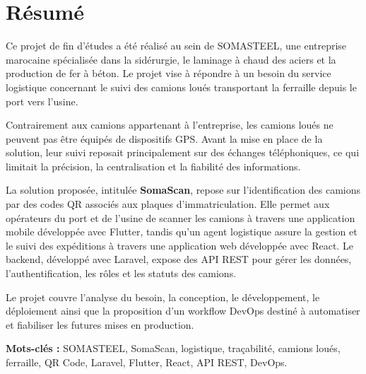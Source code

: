 \chapter*{Résumé}
{}

Ce projet de fin d'études a été réalisé au sein de SOMASTEEL, une entreprise marocaine spécialisée dans la sidérurgie, le laminage à chaud des aciers et la production de fer à béton. Le projet vise à répondre à un besoin du service logistique concernant le suivi des camions loués transportant la ferraille depuis le port vers l'usine.

Contrairement aux camions appartenant à l'entreprise, les camions loués ne peuvent pas être équipés de dispositifs GPS. Avant la mise en place de la solution, leur suivi reposait principalement sur des échanges téléphoniques, ce qui limitait la précision, la centralisation et la fiabilité des informations.

La solution proposée, intitulée \textbf{SomaScan}, repose sur l'identification des camions par des codes QR associés aux plaques d'immatriculation. Elle permet aux opérateurs du port et de l'usine de scanner les camions à travers une application mobile développée avec Flutter, tandis qu'un agent logistique assure la gestion et le suivi des expéditions à travers une application web développée avec React. Le backend, développé avec Laravel, expose des API REST pour gérer les données, l'authentification, les rôles et les statuts des camions.

Le projet couvre l'analyse du besoin, la conception, le développement, le déploiement ainsi que la proposition d'un workflow DevOps destiné à automatiser et fiabiliser les futures mises en production.

\vspace{0.5cm}

\noindent\textbf{Mots-clés :} SOMASTEEL, SomaScan, logistique, traçabilité, camions loués, ferraille, QR Code, Laravel, Flutter, React, API REST, DevOps.
